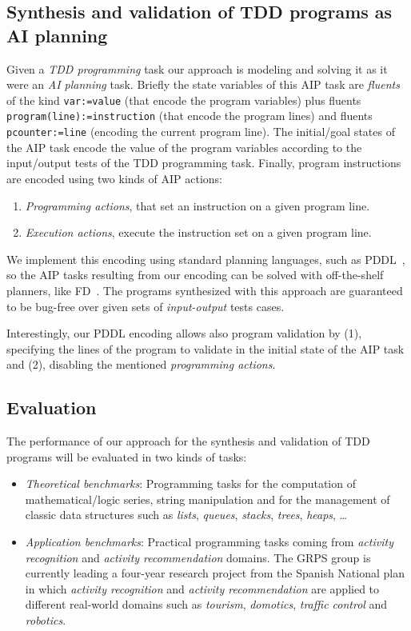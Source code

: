 \documentclass[10pt,a4paper]{paper}
\begin{document}
\subsection{Synthesis and validation of TDD programs as AI planning}
Given a {\em TDD programming} task our approach is modeling and solving it as it were an {\em AI planning} task. Briefly the state variables of this AIP task are {\em fluents} of the kind {\tt var:=value} (that encode the program variables) plus fluents {\tt program(line):=instruction} (that encode the program lines) and fluents {\tt pcounter:=line} (encoding the current program line). The initial/goal states of the AIP task encode the value of the program variables according to the input/output tests of the TDD programming task. Finally, program instructions are encoded using two kinds of AIP actions:
\begin{enumerate}
\item {\it Programming actions}, that set an instruction on a given program line.
\item {\it Execution actions}, execute the instruction set on a given program line.
\end{enumerate}
We implement this encoding using standard planning languages, such as PDDL~\cite{fox2003pddl2}, so the AIP tasks resulting from our encoding can be solved with off-the-shelf planners, like {\sc FD}~\cite{helmert2006fast}. The programs synthesized with this approach are guaranteed to be bug-free over given sets of {\em input-output} tests cases.

Interestingly, our PDDL encoding allows also program validation by (1), specifying the lines of the program to validate in the initial state of the AIP task and (2), disabling the mentioned {\it programming actions}. 

\subsection{Evaluation}
The performance of our approach for the synthesis and validation of TDD programs will be evaluated in two kinds of tasks:
\begin{itemize}
\item {\em Theoretical benchmarks}: Programming tasks for the computation of mathematical/logic series, string manipulation and for the management of classic data structures such as {\em lists}, {\em queues}, {\em stacks}, {\em trees}, {\em heaps}, \ldots
\item {\em Application benchmarks}: Practical programming tasks coming from {\em activity recognition} and {\em activity recommendation} domains. The GRPS group is currently leading a four-year research project from the Spanish National plan in which {\em activity recognition} and {\em activity recommendation} are applied to different real-world domains such as {\em tourism}, {\em domotics}, {\em traffic control} and {\em robotics}. 
\end{itemize}
\end{document}
